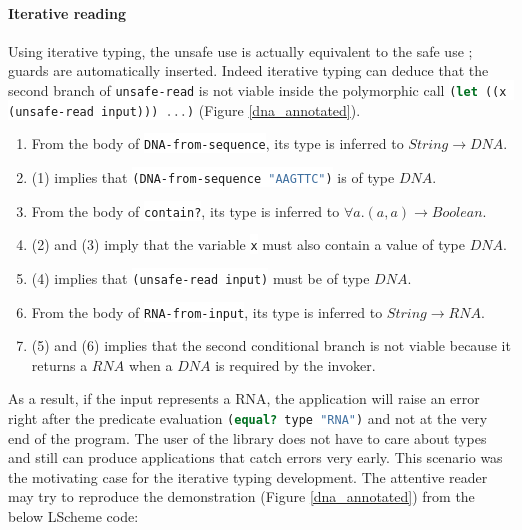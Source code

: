\documentclass[a4paper]{report}
\newcommand{\ischeme}[1]{\colorbox{white}{\lstinline[language=scheme]&#1&}} %
\newcommand{\reffig}[1]{(Figure \ref{#1})}
\begin{document}
\paragraph{Iterative reading} Using iterative typing, the unsafe use is actually equivalent to the safe use ; guards are automatically inserted. Indeed iterative typing can deduce that the second branch of \ischeme{unsafe-read} is not viable inside the polymorphic call \ischeme{(let ((x (unsafe-read input))) ...)} \reffig{dna_annotated}.
\begin{enumerate}
\item From the body of \ischeme{DNA-from-sequence}, its type is inferred to $String \to DNA$.
\item (1) implies that \ischeme{(DNA-from-sequence "AAGTTC")} is of type $DNA$.
\item From the body of \ischeme{contain?}, its type is inferred to $\forall a . (a,a) \to Boolean$.
\item (2) and (3) imply that the variable \ischeme{x} must also contain a value of type $DNA$.
\item (4) implies that \ischeme{(unsafe-read input)} must be of type $DNA$.
\item From the body of \ischeme{RNA-from-input}, its type is inferred to $String \to RNA$.
\item (5) and (6) implies that the second conditional branch is not viable because it returns a $RNA$ when a $DNA$ is required by the invoker.
\end{enumerate}
As a result, if the input represents a RNA, the application will raise an error right after the predicate evaluation \ischeme{(equal? type "RNA")} and not at the very end of the program. The user of the library does not have to care about types and still can produce applications that catch errors very early. This scenario was the motivating case for the iterative typing development. The attentive reader may try to reproduce the demonstration \reffig{dna_annotated} from the below LScheme code:
\end{document}
